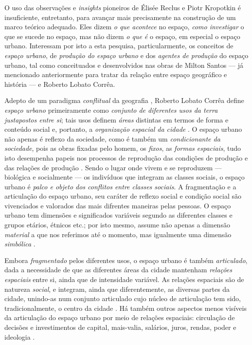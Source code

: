 
O uso das observações e \textit{insights} pioneiros de Élisée Reclus e Piotr Kropotkin é insuficiente, entretanto, para avançar mais precisamente na construção de um marco teórico adequado. Eles dizem \textit{o que acontece} no espaço, \textit{como investigar} o que se sucede no espaço, mas não dizem \textit{o que é} o espaço, em especial o espaço urbano. Interessam por isto a esta pesquisa, particularmente, os conceitos de \textit{espaço urbano}, de \textit{produção do espaço urbano} e dos \textit{agentes de produção} do espaço urbano, tal como conceituados e desenvolvidos nas obras de Milton Santos --- já mencionado anteriormente para tratar da relação entre espaço geográfico e história --- e Roberto Lobato Corrêa.

Adepto de um paradigma \textit{conflitual} da geografia \cite[p.~6]{CORREA1985espa}, Roberto Lobato Corrêa define \textit{espaço urbano} primeiramente como \textit{conjunto de diferentes usos da terra justapostos entre si}; tais usos definem \textit{áreas} distintas em termos de forma e conteúdo social e, portanto, a \textit{organização espacial da cidade} \cite[p.~7]{CORREA1985espa}. O espaço urbano não apenas é reflexo da sociedade, como é também um \textit{condicionante da sociedade}, pois as obras fixadas pelo homem, os \textit{fixos}, as \textit{formas espaciais}, tudo isto desempenha papeis nos processos de reprodução das condições de produção e das relações de produção \cite[p.~8]{CORREA1985espa}. Sendo o lugar onde vivem e se reproduzem --- biológica e socialmente --- os indivíduos que integram as classes sociais, o espaço urbano é \textit{palco e objeto dos conflitos entre classes sociais}. A fragmentação e a articulação do espaço urbano, seu caráter de reflexo social e condição social são vivenciados e valorados das mais difrentes maneiras pelas pessoas. O espaço urbano tem dimensões e significados variáveis segundo as diferentes classes e grupos etários, étnicos etc.; por isto mesmo, assume não apenas a dimensão \textit{material} a que nos referimos até o momento, mas igualmente uma dimensão \textit{simbólica} \cite[p.~150-151]{CORREA1997}.

Embora \textit{fragmentado} pelos diferentes usos, o espaço urbano é também \textit{articulado}, dada a necessidade de que as diferentes áreas da cidade mantenham \textit{relações espaciais} entre si, ainda que de intensidade variável. As relações espaciais são de natureza \textit{social}, e integram, ainda que diferentemente, as diversas partes da cidade, unindo-as num conjunto articulado cujo núcleo de articulação tem sido, tradicionalmente, o centro da cidade \cite[p.~7-8]{CORREA1985espa}. Há também outros aspectos menos visíveis da articulação do espaço urbano por meio de relações espaciais: circulação de decisões e investimentos de capital, mais-valia, salários, juros, rendas, poder e ideologia \cite[p.~147]{CORREA1997}. 

